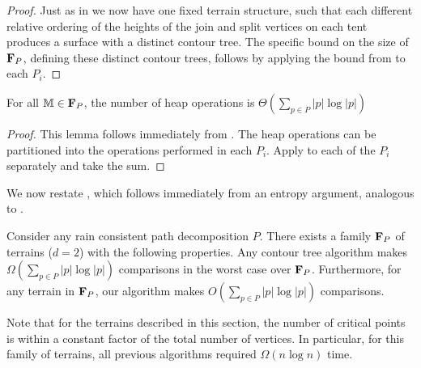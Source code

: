 {\begin{proof}
 Just as in  we now have one fixed terrain structure, such that each different relative ordering of the heights of the join and split vertices 
 on each tent produces a surface with a distinct contour tree.  The specific bound on the size of ${\bf F}_P$, defining these distinct contour trees, follows by applying the 
 bound from  to each $P_i$.
\end{proof}




\begin{lemma}
For all $\mathbb{M} \in {\bf F}_P$, the number of heap operations is $\Theta(\sum_{p\in P} |p|\log |p|)$
\end{lemma}
\begin{proof}
 This lemma follows immediately from .  The heap operations can be partitioned into the
 operations performed in each $P_i$.
 Apply  to each of the $P_i$ separately and take the sum.
\end{proof}

We now restate , which follows immediately from an entropy argument, analogous to .

\begin{theorem}\label{thm:path-main-lb}
Consider any rain consistent path decomposition $P$. There exists a family ${\bf F}_P$ of terrains ($d=2$) with the following properties.
Any contour tree algorithm makes $\Omega(\sum_{p \in P} |p|\log |p|)$ comparisons in the worst case over ${\bf F}_P$.
Furthermore, for any terrain in ${\bf F}_P$, our algorithm makes $O(\sum_{p \in P} |p|\log |p|)$ comparisons.
\end{theorem}

\begin{Remark}
 Note that for the terrains described in this section, the number of critical points is within a constant factor of 
 the total number of vertices.  In particular, for this family of terrains, all previous algorithms required $\Omega(n\log n)$ time.
\end{Remark}
}




